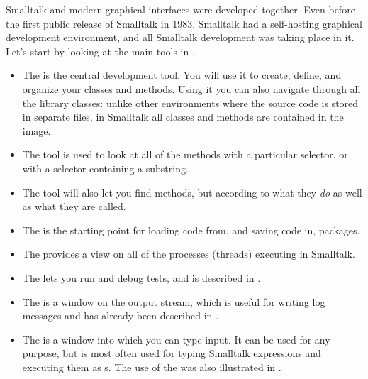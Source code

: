 \documentclass[a4paper,10pt,twoside]{book}
\begin{document}
Smalltalk and modern graphical interfaces were developed together.
Even before the first public release of Smalltalk in 1983, Smalltalk had a self-hosting graphical development environment, and all Smalltalk development was taking place in it.
Let's start by looking at the main tools in \pharo.

\begin{itemize}
	\item {The } is the central development tool. You will use it to create, define, and organize your classes and methods. Using it you can also navigate through all the library classes: unlike other environments where the source code is stored in separate files, in Smalltalk all classes and methods are contained in the image.

	\item{The } tool is used to look at all of the methods with a particular selector, or with a selector containing a substring.
	
	\item{The } tool will also let you find methods, but according to what they \emph{do} as well as what they are called.
	
	\item{The } is the starting point for loading code from, and saving code in,  packages.
	
	\item{The  provides a view on all of the processes (threads) executing in Smalltalk.}
	
	\item{The } lets you run and debug \SUnit tests, and is described in .
	
	\item{The } is a window on the  output stream, which is useful for writing log messages and has already been described in .
	
	\item{The } is a window into which you can type input.  
	It can be used for any purpose, but is most often used for typing Smalltalk expressions and 
	executing them as s. The use of the  was also illustrated in .
\end{itemize}
\end{document}
